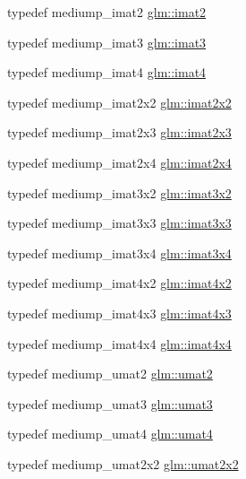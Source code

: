 \begin{DoxyCompactItemize}
\item 
typedef mediump\+\_\+imat2 \hyperlink{group__gtc__matrix__integer_ga77a581b3366fb63fc72f8f20830003e0}{glm\+::imat2}
\item 
typedef mediump\+\_\+imat3 \hyperlink{group__gtc__matrix__integer_ga45481922dd07a3a8e23758286311ee97}{glm\+::imat3}
\item 
typedef mediump\+\_\+imat4 \hyperlink{group__gtc__matrix__integer_ga40fc5c5e0b07543497aa1c314891544a}{glm\+::imat4}
\item 
typedef mediump\+\_\+imat2x2 \hyperlink{group__gtc__matrix__integer_gaf7f44f44d966377666d41ed059524732}{glm\+::imat2x2}
\item 
typedef mediump\+\_\+imat2x3 \hyperlink{group__gtc__matrix__integer_ga143bc5177bac9991d84b70da03952516}{glm\+::imat2x3}
\item 
typedef mediump\+\_\+imat2x4 \hyperlink{group__gtc__matrix__integer_gafe2d058e164fd1badace451ffcf4ae46}{glm\+::imat2x4}
\item 
typedef mediump\+\_\+imat3x2 \hyperlink{group__gtc__matrix__integer_ga04deef94cdfdd3b3b2706e10a32ef7f3}{glm\+::imat3x2}
\item 
typedef mediump\+\_\+imat3x3 \hyperlink{group__gtc__matrix__integer_gaeff9ef8f56cccc828d6b897923e75402}{glm\+::imat3x3}
\item 
typedef mediump\+\_\+imat3x4 \hyperlink{group__gtc__matrix__integer_gaee5507e6cbbdd05841a0c174e60dd036}{glm\+::imat3x4}
\item 
typedef mediump\+\_\+imat4x2 \hyperlink{group__gtc__matrix__integer_ga7e733984837e0e7aa9f4aac18f632f63}{glm\+::imat4x2}
\item 
typedef mediump\+\_\+imat4x3 \hyperlink{group__gtc__matrix__integer_gaa4cca8e80c0603239eda452860063844}{glm\+::imat4x3}
\item 
typedef mediump\+\_\+imat4x4 \hyperlink{group__gtc__matrix__integer_ga367d8d5281ff82f1215a227dd2ea5ba9}{glm\+::imat4x4}
\item 
typedef mediump\+\_\+umat2 \hyperlink{group__gtc__matrix__integer_gae2d45c058cfa0b60ab4df0cdda2d8516}{glm\+::umat2}
\item 
typedef mediump\+\_\+umat3 \hyperlink{group__gtc__matrix__integer_ga8b8fbc858e28abf8fc344744f8d6d368}{glm\+::umat3}
\item 
typedef mediump\+\_\+umat4 \hyperlink{group__gtc__matrix__integer_ga7ae562000d8a8d193e9f93cf51e2e113}{glm\+::umat4}
\item 
typedef mediump\+\_\+umat2x2 \hyperlink{group__gtc__matrix__integer_gad3c997b31dd69bdb4787867e758ed48d}{glm\+::umat2x2}

\end{DoxyCompactItemize}
